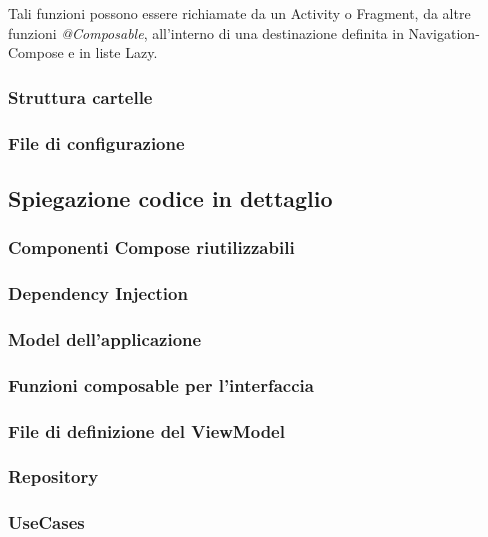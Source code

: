 \documentclass{article}
\begin{document}
Tali funzioni possono essere richiamate da un Activity o Fragment, da altre funzioni \textit{@Composable}, all'interno di una destinazione definita in Navigation-Compose e in liste Lazy.

\subsubsection{Struttura cartelle}

\subsubsection{File di configurazione}

\subsection{Spiegazione codice in dettaglio}

\subsubsection{Componenti Compose riutilizzabili}

\subsubsection{Dependency Injection}

\subsubsection{Model dell'applicazione}

\subsubsection{Funzioni composable per l'interfaccia}

\subsubsection{File di definizione del ViewModel}

\subsubsection{Repository}

\subsubsection{UseCases}
\end{document}
